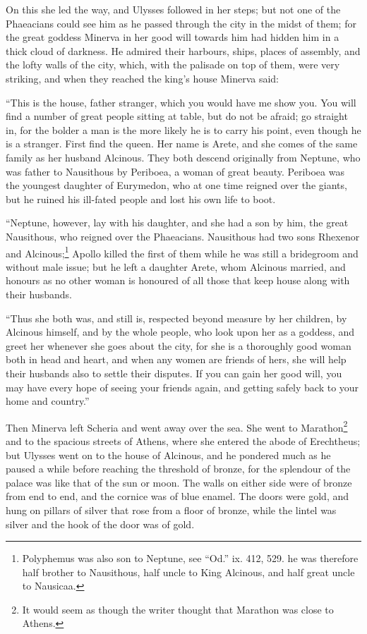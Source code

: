 On this she led the way, and Ulysses followed in her steps; but not one of the
Phaeacians could see him as he passed through the city in the midst of them;
for the great goddess Minerva in her good will towards him had hidden him in a
thick cloud of darkness. He admired their harbours, ships, places of assembly,
and the lofty walls of the city, which, with the palisade on top of them, were
very striking, and when they reached the king’s house Minerva said:

“This is the house, father stranger, which you would have me show you. You will
find a number of great people sitting at table, but do not be afraid; go
straight in, for the bolder a man is the more likely he is to carry his point,
even though he is a stranger. First find the queen. Her name is Arete, and she
comes of the same family as her husband Alcinous. They both descend originally
from Neptune, who was father to Nausithous by Periboea, a woman of great
beauty. Periboea was the youngest daughter of Eurymedon, who at one time
reigned over the giants, but he ruined his ill-fated people and lost his own
life to boot.

“Neptune, however, lay with his daughter, and she had a son by him, the great
Nausithous, who reigned over the Phaeacians. Nausithous had two sons Rhexenor
and Alcinous;\footnote{Polyphemus was also son to Neptune, see “Od.” ix. 412, 529. he was therefore
half brother to Nausithous, half uncle to King Alcinous, and half great uncle
to Nausicaa.}
Apollo killed the first of them while he was still a bridegroom and without
male issue; but he left a daughter Arete, whom Alcinous married, and honours as
no other woman is honoured of all those that keep house along with their
husbands.

“Thus she both was, and still is, respected beyond measure by her children, by
Alcinous himself, and by the whole people, who look upon her as a goddess, and
greet her whenever she goes about the city, for she is a thoroughly good woman
both in head and heart, and when any women are friends of hers, she will help
their husbands also to settle their disputes. If you can gain her good will,
you may have every hope of seeing your friends again, and getting safely back
to your home and country.”

Then Minerva left Scheria and went away over the sea. She went to Marathon\footnote{It would seem as though the writer thought that Marathon was close to
Athens.} and to the
spacious streets of Athens, where she entered the abode of Erechtheus; but
Ulysses went on to the house of Alcinous, and he pondered much as he paused a
while before reaching the threshold of bronze, for the splendour of the palace
was like that of the sun or moon. The walls on either side were of bronze from
end to end, and the cornice was of blue enamel. The doors were gold, and hung
on pillars of silver that rose from a floor of bronze, while the lintel was
silver and the hook of the door was of gold.

